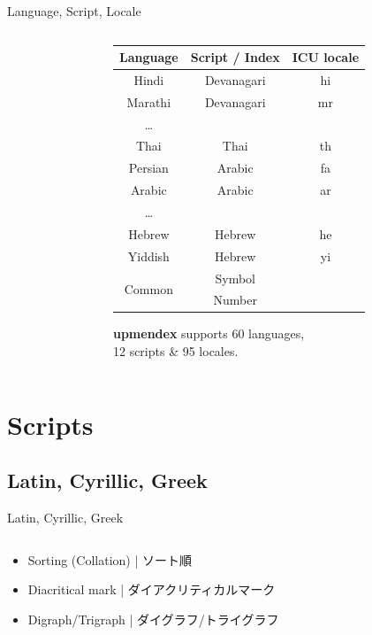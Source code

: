 \documentclass[aspectratio=169,10pt]{beamer}
\begin{document}
\begin{frame}[fragile]{Language, Script, Locale}
\begin{columns}
\begin{column}{70mm}
\begin{center}
\end{center}
\end{column}
\begin{column}{58mm}
\footnotesize
\begin{center}
\begin{tabular}{ccc}
  Language  & Script / Index & ICU locale \\\hline\hline
  Hindi     & Devanagari     & hi             \\
  Marathi   & Devanagari     & mr             \\
  \ldots    &                &                \\\hdashline
  Thai      & Thai           & th             \\\hline
  Persian   & Arabic         & fa             \\
  Arabic    & Arabic         & ar             \\
  \ldots    &                &                \\\hdashline
  Hebrew    & Hebrew         & he             \\
  Yiddish   & Hebrew         & yi             \\\hline
  \multirow{2}{*}{Common}  & Symbol   &       \\
            & Number         &                \\\hline
\end{tabular}
\end{center}
\vspace{2mm}
\normalsize
\textbf{upmendex} supports 60 languages,\\12 scripts \& 95 locales.
\end{column}
\end{columns}
\end{frame}


\section{Scripts}
\subsection{Latin, Cyrillic, Greek}
\begin{frame}{Latin, Cyrillic, Greek}
\begin{columns}
\begin{column}{120mm}
\begin{center}
\large
  \begin{itemize}
    \item Sorting (Collation) | ソート順
    \item Diacritical mark | ダイアクリティカルマーク
    \item Digraph/Trigraph | ダイグラフ/トライグラフ
  \end{itemize}
\end{center}
\end{column}
\end{columns}
\end{frame}
\end{document}
